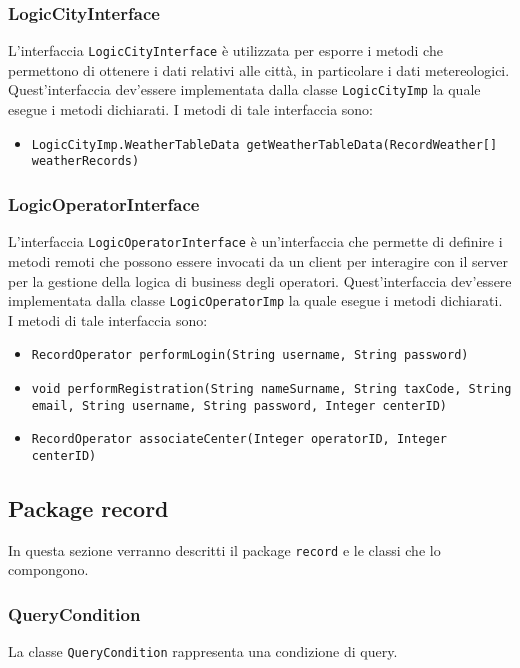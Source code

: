 \subsubsection{LogicCityInterface}
L'interfaccia \texttt{LogicCityInterface} è utilizzata per esporre i metodi che permettono di ottenere i dati relativi alle città, in particolare i dati metereologici.
Quest'interfaccia dev'essere implementata dalla classe \texttt{LogicCityImp} la quale esegue i metodi dichiarati.
I metodi di tale interfaccia sono:
\begin{itemize}
    \item \texttt{LogicCityImp.WeatherTableData getWeatherTableData(RecordWeather[] weatherRecords)}
\end{itemize}

\subsubsection{LogicOperatorInterface}
L'interfaccia \texttt{LogicOperatorInterface} è un'interfaccia che permette di definire i metodi remoti che possono essere invocati da un client per interagire con il server per la gestione della logica di business degli operatori.
Quest'interfaccia dev'essere implementata dalla classe \texttt{LogicOperatorImp} la quale esegue i metodi dichiarati.
I metodi di tale interfaccia sono:
\begin{itemize}
    \item \texttt{RecordOperator performLogin(String username, String password)}
    \item \texttt{void performRegistration(String nameSurname, String taxCode, String email, String username, String password, Integer centerID)}
    \item \texttt{RecordOperator associateCenter(Integer operatorID, Integer centerID)}
\end{itemize}

\subsection{Package record}
In questa sezione verranno descritti il package \texttt{record} e le classi che lo compongono.\\

\subsubsection{QueryCondition}
La classe \texttt{QueryCondition} rappresenta una condizione di query.


